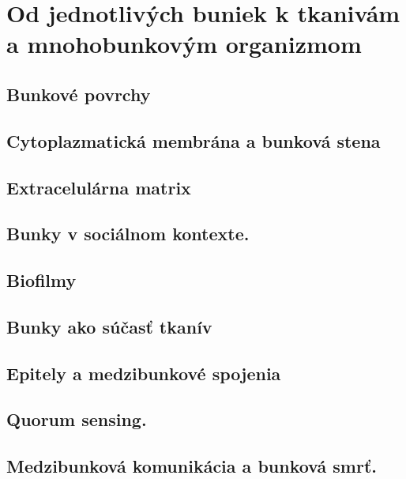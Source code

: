\section{Od jednotlivých buniek k tkanivám a mnohobunkovým organizmom}

\subsection{Bunkové povrchy}

\subsection{Cytoplazmatická membrána a bunková stena}

\subsection{Extracelulárna matrix}

\subsection{Bunky v sociálnom kontexte.}

\subsection{Biofilmy}

\subsection{Bunky ako súčasť tkanív}

\subsection{Epitely a medzibunkové spojenia}

\subsection{Quorum sensing.}

\subsection{Medzibunková komunikácia a bunková smrť.}
